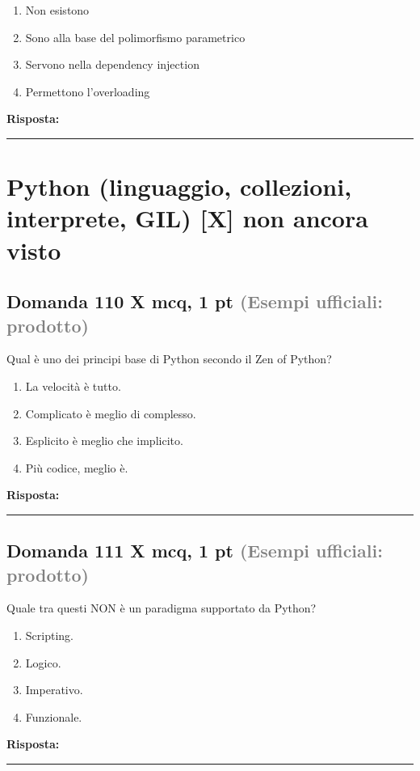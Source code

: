 \documentclass[a4paper,11pt]{article}
\begin{document}
\begin{enumerate}[label=\alph*)]
\item Non esistono
\item Sono alla base del polimorfismo parametrico
\item Servono nella dependency injection
\item Permettono l'overloading
\end{enumerate}
\vspace{0.2cm}
\noindent\textbf{Risposta:}\par
\vspace{1.5cm}\hrule


\section{Python (linguaggio, collezioni, interprete, GIL) [X] non ancora visto}

\subsection*{Domanda 110 X \hfill {\small mcq, 1 pt \textcolor{gray}{(Esempi ufficiali: prodotto)}}}
Qual è uno dei principi base di Python secondo il Zen of Python?

\begin{enumerate}[label=\alph*)]
\item La velocità è tutto.
\item Complicato è meglio di complesso.
\item Esplicito è meglio che implicito.
\item Più codice, meglio è.
\end{enumerate}
\vspace{0.2cm}
\noindent\textbf{Risposta:}\par
\vspace{1.5cm}\hrule


\subsection*{Domanda 111 X \hfill {\small mcq, 1 pt \textcolor{gray}{(Esempi ufficiali: prodotto)}}}
Quale tra questi NON è un paradigma supportato da Python?

\begin{enumerate}[label=\alph*)]
\item Scripting.
\item Logico.
\item Imperativo.
\item Funzionale.
\end{enumerate}
\vspace{0.2cm}
\noindent\textbf{Risposta:}\par
\vspace{1.5cm}\hrule
\end{document}

